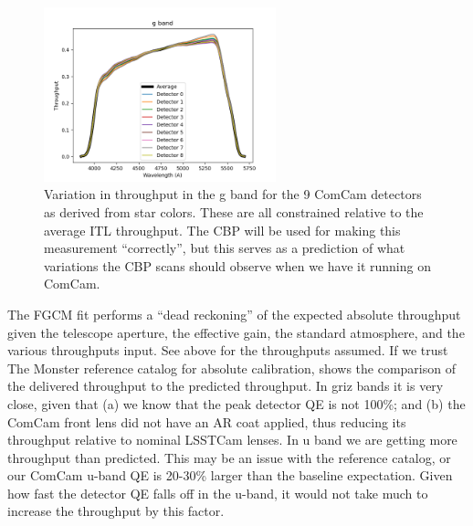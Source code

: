 \begin{figure}
  \begin{center}
    \includegraphics[width=0.6\textwidth]{photometric_calibration_figures/detector_chromaticity_g.png}
  \end{center}
  \caption{Variation in throughput in the g band for the 9 ComCam detectors as
    derived from star colors. These are all constrained relative to the average
    ITL throughput. The CBP will be used for making this measurement
    ``correctly'', but this serves as a prediction of what variations the CBP
    scans should observe when we have it running on ComCam.}
\end{figure}


The FGCM fit performs a ``dead reckoning'' of the expected absolute throughput
given the telescope aperture, the effective gain, the standard atmosphere, and
the various throughputs input.  See above for the throughputs assumed.  If we
trust The Monster reference catalog for absolute calibration,
 shows the comparison of the delivered
throughput to the predicted throughput.  In griz bands it is very close, given
that (a) we know that the peak detector QE is not 100\%; and (b) the ComCam
front lens did not have an AR coat applied, thus reducing its throughput
relative to nominal LSSTCam lenses.  In u band we are getting more throughput
than predicted.  This may be an issue with the reference catalog, or our ComCam
u-band QE is 20-30\% larger than the baseline expectation.  Given how fast the
detector QE falls off in the u-band, it would not take much to increase the
throughput by this factor.

